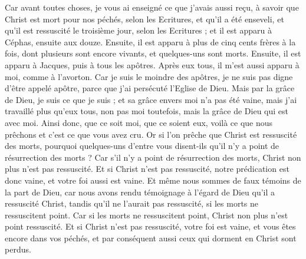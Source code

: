 \begin{multicols}{2}
Car avant toutes choses, je vous ai enseigné ce que j'avais aussi reçu, à savoir que Christ est mort pour nos péchés, selon les Ecritures,
et qu'il a été enseveli, et qu'il est ressuscité le troisième jour, selon les Ecritures ;
et il est apparu à Céphas, ensuite aux douze.
Ensuite, il est apparu à plus de cinq cents frères à la fois, dont plusieurs sont encore vivants, et quelques-uns sont morts.
Ensuite, il est apparu à Jacques, puis à tous les apôtres.
Après eux tous, il m’est aussi apparu à moi, comme à l’avorton.
Car je suis le moindre des apôtres, je ne suis pas digne d'être appelé apôtre, parce que j'ai persécuté l'Eglise de Dieu.
Mais par la grâce de Dieu, je suis ce que je suis ; et sa grâce envers moi n'a pas été vaine, mais j'ai travaillé plus qu'eux tous, non pas moi toutefois, mais la grâce de Dieu qui est avec moi.
Ainsi donc, que ce soit moi, que ce soient eux, voilà ce que nous prêchons et c’est ce que vous avez cru.
Or si l’on prêche que Christ est ressuscité des morts, pourquoi quelques-uns d'entre vous disent-ils qu'il n'y a point de résurrection des morts ?
Car s'il n'y a point de résurrection des morts, Christ non plus n'est pas ressuscité.
Et si Christ n'est pas ressuscité, notre prédication est donc vaine, et votre foi aussi est vaine.
Et même nous sommes de faux témoins de la part de Dieu, car nous avons rendu témoignage à l’égard de Dieu qu'il a ressuscité Christ, tandis qu’il ne l’aurait pas ressuscité, si les morts ne ressuscitent point.
Car si les morts ne ressuscitent point, Christ non plus n'est point ressuscité.
Et si Christ n'est pas ressuscité, votre foi est vaine, et vous êtes encore dans vos péchés,
et par conséquent aussi ceux qui dorment en Christ sont perdus.

\end{multicols}
